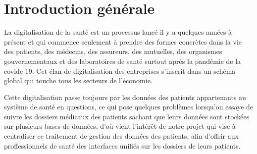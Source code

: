 
\chapter*{Introduction générale}



La digitalisation de la santé est un processus lancé il y a quelques années à présent et qui commence seulement à prendre des formes concrètes dans la vie des patients, des médecins, des assureurs, des mutuelles, des organismes gouvernementaux et des laboratoires de santé surtout après la pandémie de la covide 19. Cet élan de digitalisation des entreprises s'inscrit dans un schéma global qui touche tous les secteurs de l'économie.

Cette digitalisation passe toujours par les données des patients appartenants au système de santé en questions, ce qui pose quelques problèmes lorsqu'on essaye de suivre les dossiers médicaux des patients sachant que leurs données sont stockées sur plusieurs bases de données, d'où vient l'intérêt de notre projet qui vise à centraliser ce traitement de gestion des données des patients, afin d'offrir aux proffessionnels de santé des interfaces unifiés sur les dossiers de leurs patients.

